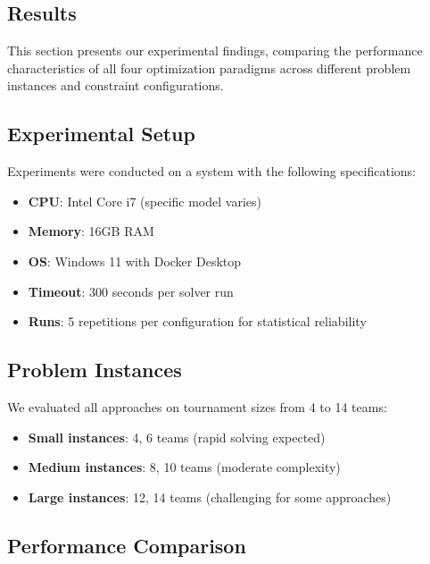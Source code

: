 \documentclass[11pt]{article}
\begin{document}
\begin{itemize}
\section{Results}

This section presents our experimental findings, comparing the performance characteristics of all four optimization paradigms across different problem instances and constraint configurations.

\subsection{Experimental Setup}

Experiments were conducted on a system with the following specifications:
\begin{itemize}
    \item \textbf{CPU}: Intel Core i7 (specific model varies)
    \item \textbf{Memory}: 16GB RAM
    \item \textbf{OS}: Windows 11 with Docker Desktop
    \item \textbf{Timeout}: 300 seconds per solver run
    \item \textbf{Runs}: 5 repetitions per configuration for statistical reliability
\end{itemize}

\subsection{Problem Instances}

We evaluated all approaches on tournament sizes from 4 to 14 teams:
\begin{itemize}
    \item \textbf{Small instances}: 4, 6 teams (rapid solving expected)
    \item \textbf{Medium instances}: 8, 10 teams (moderate complexity)
    \item \textbf{Large instances}: 12, 14 teams (challenging for some approaches)
\end{itemize}

\subsection{Performance Comparison}


\end{itemize}
\end{document}
